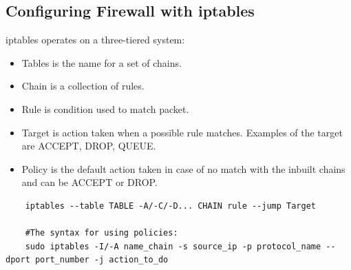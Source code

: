 \subsection{Configuring Firewall with iptables}
iptables operates on a three-tiered system:
\begin{itemize}
    \item Tables is the name for a set of chains.
    \item Chain is a collection of rules.
    \item Rule is condition used to match packet.
    \item Target is action taken when a possible rule matches. Examples of the target are ACCEPT, DROP, QUEUE.
    \item Policy is the default action taken in case of no match with the inbuilt chains and can be ACCEPT or DROP.
\end{itemize}
\begin{lstlisting}
    iptables --table TABLE -A/-C/-D... CHAIN rule --jump Target

    #The syntax for using policies:  
    sudo iptables -I/-A name_chain -s source_ip -p protocol_name --dport port_number -j action_to_do 
\end{lstlisting}  

